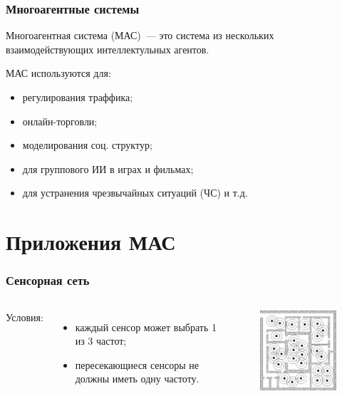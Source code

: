 \documentclass{beamer}
\begin{document}
\begin{frame}
  \frametitle{Многоагентные системы}
  Многоагентная система (МАС)~--- это система из нескольких взаимодействующих
  интеллектульных агентов.

  МАС используются для:
  \begin{itemize}
    \item регулирования траффика;
    \item онлайн-торговли;
    \item моделирования соц. структур;
    \item для группового ИИ в играх и фильмах;
    \item для устранения чрезвычайных ситуаций (ЧС) и т.д.
  \end{itemize}
\end{frame}

\section{Приложения МАС}

\begin{frame}
  \frametitle{Сенсорная сеть}
  \begin{columns}[c]
    Условия:
    \begin{itemize}
      \item каждый сенсор может выбрать 1 из 3 частот;
      \item пересекающиеся сенсоры не должны иметь одну частоту.
    \end{itemize}

    \begin{figure}
       \includegraphics[width=5cm]{images/sensors.jpg}
    \end{figure}
  \end{columns}
\end{frame}
\end{document}
